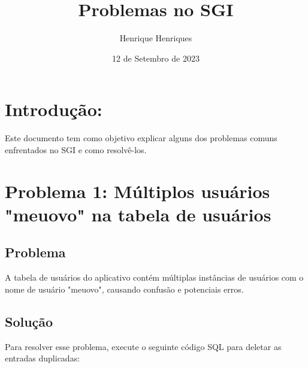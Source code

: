 \documentclass[12pt]{article}
\title{Problemas no SGI}
\author{Henrique Henriques}
\date{12 de Setembro de 2023}
\begin{document}
\maketitle

\section{Introdução:}
Este documento tem como objetivo explicar alguns dos problemas comuns enfrentados no SGI e como resolvê-los.

\section{Problema 1: Múltiplos usuários "meuovo" na tabela de usuários}
\subsection{Problema}
A tabela de usuários do aplicativo contém múltiplas instâncias de usuários com o nome de usuário "meuovo", causando confusão e potenciais erros.

\subsection{Solução}
Para resolver esse problema, execute o seguinte código SQL para deletar as entradas duplicadas:
\end{document}
